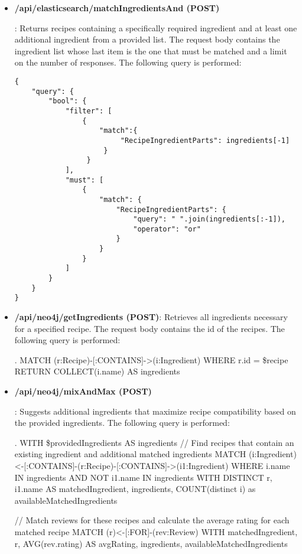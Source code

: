 \begin{itemize}
\item \hypertarget{fun:matchIngredientsAnd}{\textbf{/api/elasticsearch/matchIngredientsAnd (POST)}}: Returns recipes containing a specifically required ingredient and at least one additional ingredient from a provided list. The request body contains the ingredient list whose last item is the one that must be matched and a limit on the number of responses. The following query is performed:
\begin{lstlisting}[language=Elasticsearch]
{
    "query": {
        "bool": {
            "filter": [
                {
                    "match":{
                         "RecipeIngredientParts": ingredients[-1]
                     }
                 }
            ],
            "must": [
                {
                    "match": {
                        "RecipeIngredientParts": {
                            "query": " ".join(ingredients[:-1]),
                            "operator": "or"
                        }
                    }
                }
            ]
        }
    }
}
\end{lstlisting}

\item \textbf{/api/neo4j/getIngredients (POST)}: Retrieves all ingredients necessary for a specified recipe. The request body contains the id of the recipes. The following query is performed:
\begin{CypherQuery}
.
MATCH (r:Recipe)-[:CONTAINS]->(i:Ingredient)
WHERE r.id = \$recipe
RETURN COLLECT(i.name) AS ingredients
\end{CypherQuery}

\item \hypertarget{fun:mixAndMax}{\textbf{/api/neo4j/mixAndMax (POST)}}: Suggests additional ingredients that maximize recipe compatibility based on the provided ingredients. The following query is performed: 
\begin{CypherQuery}
.
WITH \$providedIngredients AS ingredients
// Find recipes that contain an existing ingredient and additional matched ingredients
MATCH (i:Ingredient)<-[:CONTAINS]-(r:Recipe)-[:CONTAINS]->(i1:Ingredient)
WHERE i.name IN ingredients AND NOT i1.name IN ingredients
WITH DISTINCT r, i1.name AS matchedIngredient, ingredients, COUNT(distinct i) as availableMatchedIngredients

// Match reviews for these recipes and calculate the average rating for each matched recipe
MATCH (r)<-[:FOR]-(rev:Review)
WITH matchedIngredient, r, AVG(rev.rating) AS avgRating, ingredients, availableMatchedIngredients


\end{CypherQuery}
\end{itemize}
